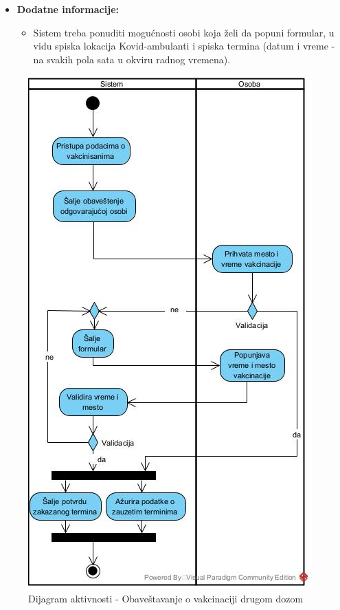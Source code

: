 \documentclass[titlepage]{article}
\begin{document}
\begin{itemize}
\begin{itemize}
    \end{itemize}
    \item \textbf{Dodatne informacije:}
    \begin{itemize}
        \item Sistem treba ponuditi mogućnosti osobi koja želi da popuni formular, u vidu spiska lokacija Kovid-ambulanti i spiska termina (datum i vreme - na svakih pola sata u okviru radnog vremena).
    \end{itemize}
\end{itemize}


\begin{figure}[H]
\centering
\includegraphics[scale=0.8]{Vakcinacija_drugom_dozom}
\caption{Dijagram aktivnosti - Obaveštavanje o vakcinaciji drugom dozom}
\end{figure}
\end{document}
